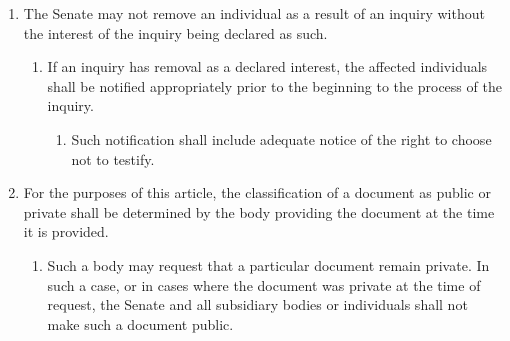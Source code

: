 \documentclass{uniondoc}
\begin{document}
\begin{enumerate}
\begin{enumerate}
\begin{enumerate}
			            \item A lack of testimony from an individual in an inquiry pertaining to their removal shall not be used by the Senate as cause for removal, nor shall any other sanction be imposed as a result of that individual's lack of testimony.
		            \end{enumerate}
		      \item To compel the provision of documents belonging to the Union, which includes but is not limited to Bylaws, meeting minutes, committee records, and attendance records, in such cases where an individual or body does not comply with a request for such documents pursuant to subclause (b).
		            \begin{enumerate}
			            \item No documents may be compelled which are reasonably considered to be primarily the private affairs of individuals.
			                  All contests regarding this provision shall be appealed to the Judicial Board.
		            \end{enumerate}
	      \end{enumerate}
	\item The Senate may not remove an individual as a result of an inquiry without the interest of the inquiry being declared as such.
	      \begin{enumerate}
		      \item If an inquiry has removal as a declared interest, the affected individuals shall be notified appropriately prior to the beginning to the process of the inquiry.
		            \begin{enumerate}
			            \item Such notification shall include adequate notice of the right to choose not to testify.
		            \end{enumerate}
	      \end{enumerate}
	\item For the purposes of this article, the classification of a document as public or private shall be determined by the body providing the document at the time it is provided.
	      \begin{enumerate}
		      \item Such a body may request that a particular document remain private.
		            In such a case, or in cases where the document was private at the time of request, the Senate and all subsidiary bodies or individuals shall not make such a document public.
	      \end{enumerate}

\end{enumerate}
\end{document}
